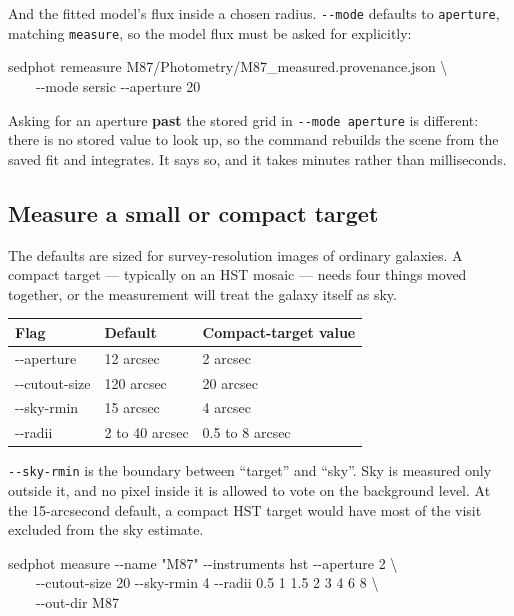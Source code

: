 \documentclass[11pt]{article}
\begin{document}
And the fitted model's flux inside a chosen radius. \texttt{-{}-mode} defaults
to \texttt{aperture}, matching \texttt{measure}, so the model flux must be
asked for explicitly:

\begin{cmd}\ttfamily\frenchspacing
sedphot remeasure M87/Photometry/M87\_measured.provenance.json \textbackslash\\
\mbox{}~~~~-{}-mode sersic -{}-aperture 20
\end{cmd}

Asking for an aperture \textbf{past} the stored grid in
\texttt{-{}-mode aperture} is different: there is no stored value to look
up, so the command rebuilds the scene from the saved fit and integrates.
It says so, and it takes minutes rather than milliseconds.

\subsection{Measure a small or compact target}

The defaults are sized for survey-resolution images of ordinary galaxies.
A compact target --- typically on an HST mosaic --- needs four things
moved together, or the measurement will treat the galaxy itself as sky.

\begin{center}
\begin{tabular}{T{3.2cm} L{3.6cm} L{4.6cm}}
\toprule
\textbf{\normalfont Flag} & \textbf{Default} & \textbf{Compact-target value} \\
\midrule
-{}-aperture & 12 arcsec & 2 arcsec \\
-{}-cutout-size & 120 arcsec & 20 arcsec \\
-{}-sky-rmin & 15 arcsec & 4 arcsec \\
-{}-radii & 2 to 40 arcsec & 0.5 to 8 arcsec \\
\bottomrule
\end{tabular}
\end{center}

\texttt{-{}-sky-rmin} is the boundary between \enquote{target} and \enquote{sky}. Sky
is measured only outside it, and no pixel inside it is allowed to vote on
the background level. At the 15-arcsecond default, a compact HST target
would have most of the visit excluded from the sky estimate.

\begin{cmd}\ttfamily\frenchspacing
sedphot measure -{}-name "M87" -{}-instruments hst -{}-aperture 2 \textbackslash\\
\mbox{}~~~~-{}-cutout-size 20 -{}-sky-rmin 4 -{}-radii 0.5 1 1.5 2 3 4 6 8 \textbackslash\\
\mbox{}~~~~-{}-out-dir M87
\end{cmd}
\end{document}
